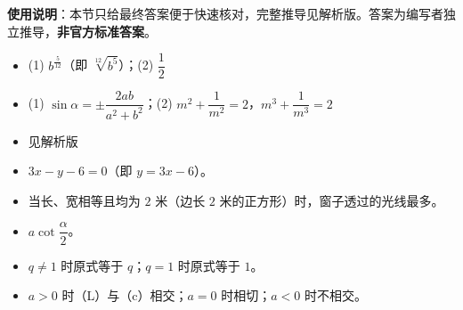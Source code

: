 
\begin{gknotice}
\textbf{使用说明}：本节只给最终答案便于快速核对，完整推导见解析版。答案为编写者独立推导，\textbf{非官方标准答案}。
\end{gknotice}

\begin{itemize}[leftmargin=2.6em]
  \item[\textbf{1.}] (1) $b^{\frac{5}{12}}$（即 $\sqrt[12]{b^{5}}$）；(2) $\dfrac{1}{2}$
  \item[\textbf{2.}] (1) $\sin\alpha=\pm\dfrac{2ab}{a^{2}+b^{2}}$；(2) $m^{2}+\dfrac{1}{m^{2}}=2$，$m^{3}+\dfrac{1}{m^{3}}=2$
  \item[\textbf{3.}] 见解析版
  \item[\textbf{4.}] $3x-y-6=0$（即 $y=3x-6$）。
  \item[\textbf{5.}] 当长、宽相等且均为 $2$ 米（边长 $2$ 米的正方形）时，窗子透过的光线最多。
  \item[\textbf{6.}] $a\cot\dfrac{\alpha}{2}$。
  \item[\textbf{7.}] $q\neq1$ 时原式等于 $q$；$q=1$ 时原式等于 $1$。
  \item[\textbf{8.}] $a>0$ 时（L）与（c）相交；$a=0$ 时相切；$a<0$ 时不相交。
\end{itemize}
